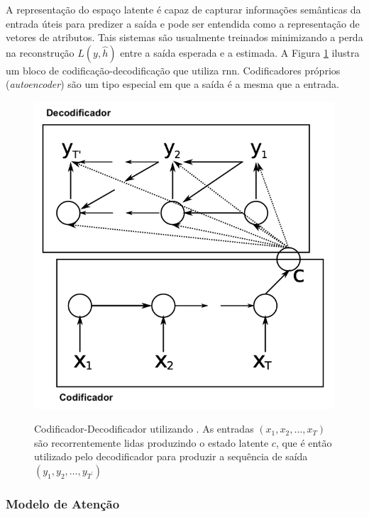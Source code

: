 A representação do espaço latente é capaz de capturar informações semânticas da entrada úteis para predizer a saída e pode ser entendida como a representação de vetores de atributos. Tais sistemas são usualmente treinados minimizando a perda na reconstrução $L(y, \hat{h})$ entre a saída esperada e a estimada. A Figura \ref{fig:encoder-decode-rnn} ilustra um bloco de codificação-decodificação que utiliza \gls{rnn}. Codificadores próprios (\textit{autoencoder}) são um tipo especial em que a saída é a mesma que a entrada.
\begin{figure}[htbp]
    \centering
        \caption[Codificador-Decodificador utilizando .]{Codificador-Decodificador utilizando . As entradas $(x_1, x_2, \dots, x_T)$ são recorrentemente lidas produzindo o estado latente $c$, que é então utilizado pelo decodificador para produzir a sequência de saída $(y_1, y_2, \dots, y_{T^\prime})$}
        \includegraphics[scale=0.85]{resources/images/pln/encoder-decoder-rnn.png}
        \label{fig:encoder-decode-rnn}
\end{figure}

\subsubsection{Modelo de Atenção}
\label{sec:encoder-decoder-attention}

